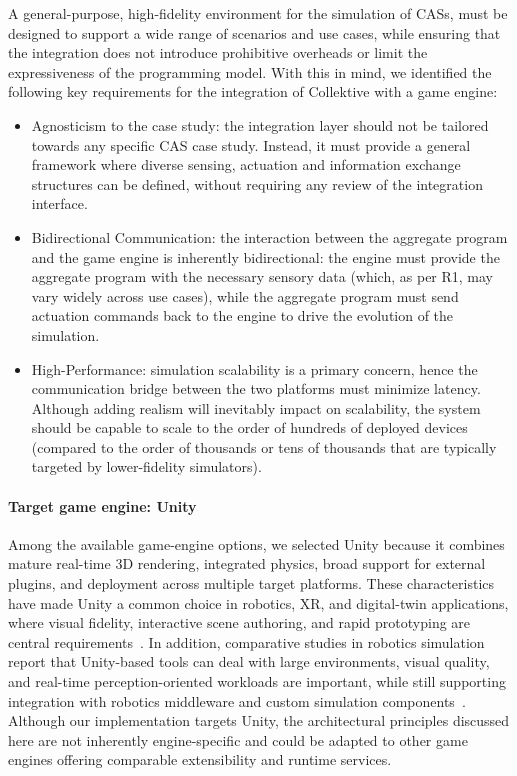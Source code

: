 \documentclass[runningheads]{llncs}
\begin{document}
A general-purpose, high-fidelity environment for the simulation of \acp{CAS},
must be designed to support a wide range of scenarios and use cases,
while ensuring that the integration does not introduce prohibitive overheads
or limit the expressiveness of the programming model.
%
With this in mind, we identified the following key requirements for the integration of Collektive with a game engine:
\begin{itemize}
    \item[R1] Agnosticism to the case study:
    the integration layer should not be tailored towards any specific \ac{CAS} case study.
    Instead, it must provide a general framework where diverse sensing, actuation and information exchange structures can be defined,
    without requiring any review of the integration interface.
    \item[R2] Bidirectional Communication:
    the interaction between the aggregate program and the game engine is inherently bidirectional:
    the engine must provide the aggregate program with the necessary sensory data
    (which, as per R1, may vary widely across use cases),
    while the aggregate program must send actuation commands back to the engine to drive the evolution of the simulation.
    \item[R3] High-Performance: simulation scalability is a primary concern,
    hence the communication bridge between the two platforms must minimize latency.
    Although adding realism will inevitably impact on scalability,
    the system should be capable to scale to the order of hundreds of deployed devices
    (compared to the order of thousands or tens of thousands that are typically targeted by lower-fidelity simulators).
\end{itemize}

\paragraph{Target game engine: Unity}

Among the available game-engine options,
we selected Unity because it combines mature real-time 3D rendering,
integrated physics, broad support for external plugins,
and deployment across multiple target platforms.
%
These characteristics have made Unity a common choice in robotics, XR, and digital-twin applications,
where visual fidelity, interactive scene authoring, and rapid prototyping are central requirements~\cite{Coronado2023XRGameEngines}.
%
In addition, comparative studies in robotics simulation report that Unity-based tools can deal with
large environments, visual quality, and real-time perception-oriented workloads are important,
while still supporting integration with robotics middleware and custom simulation components~\cite{DBLP:journals/jirs/PlattR22,DBLP:journals/simpra/WijayaCPKG24,Singh2025UnityGazeboDT}.
%
Although our implementation targets Unity, the architectural principles discussed here are not inherently engine-specific
and could be adapted to other game engines offering comparable extensibility and runtime services.
\end{document}
